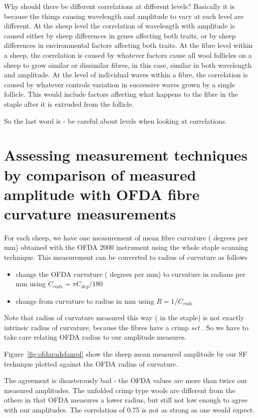 \documentclass[titlepage,10pt]{article}  %
\begin{document}
Why should there be different correlations at different levels? Basically it is because the things causing wavelength and amplitude to vary at each level are different. At the sheep level the correlation of wavelength with amplitude is caused either by sheep differences in genes affecting both traits, or by sheep differences in environmental factors affecting both traits. At the fibre level within a sheep, the correlation is caused by whatever factors cause all wool follicles on a sheep to grow similar or dissimilar fibres, in this case, similar in both wavelength and amplitude. At the level of individual waves within a fibre, the correlation is caused by whatever controls variation in successive waves grown by a single follicle. This would include factors affecting what happens to the fibre in the staple after it is extruded from the follicle.

So the last word is - be careful about levels when looking at correlations. 


\clearpage
\section{Assessing measurement techniques by comparison of measured amplitude with OFDA fibre curvature measurements}
For each sheep, we have one measurement of mean fibre curvature ( degrees per mm) obtained with the OFDA 2000 instrument using the whole staple scanning technique.  This measurement can be converted to radius of curvature as follows
\begin{itemize}
\item change the OFDA curvature ( degrees per mm) to curvature in radians per mm using $C_{rads} = \pi C_{deg} / 180$
\item change from curvature to radius in mm using $R = 1/C_{rads}$
\end{itemize}
Note that radius of curvature measured this way ( in the staple) is not exactly intrinsic radius of curvature, because the fibres have a crimp {\em set} . So we have to take care relating OFDA radius to our amplitude measures. 


Figure~\ref{fig:ofdaradsfampl} show the sheep mean measured amplitude by our SF technique plotted against the OFDA radius of curvature.

 The agreement is disasterously bad - the OFDA values are more than twice our measured amplitudes. The unfolded crimp type wools are different from the others in that OFDA measures a lower radius, but still not low enough to agree with our amplitudes. The correlation of 0.75 is not as strong as one would expect.
\end{document}
